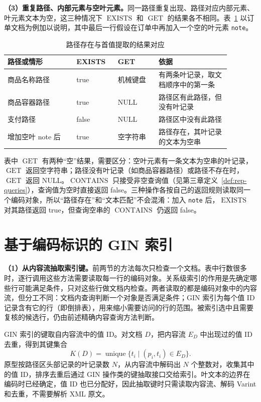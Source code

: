 \textbf{（3）重复路径、内部元素与空叶元素。}同一路径重复出现、路径对应内部元素、叶元素文本为空，这三种情况下 $\operatorname{EXISTS}$ 和 $\operatorname{GET}$ 的结果各不相同。表~\ref{tab:path-example-semantics} 以订单文档为例加以说明，其中最后一行假设在订单中再加入一个空的叶元素 \texttt{note}。
\begin{table}[htbp]
\centering\small
\caption{路径存在与首值提取的结果对应}
\label{tab:path-example-semantics}
\begin{tabular}{p{0.27\linewidth}p{0.16\linewidth}p{0.16\linewidth}p{0.29\linewidth}}
\toprule
路径或情形 & EXISTS & GET & 依据 \\
\midrule
商品名称路径 & true & 机械键盘 & 有两条叶记录，取文档顺序中的第一条 \\
商品容器路径 & true & NULL & 路径区有此路径，但没有叶记录 \\
支付路径 & false & NULL & 路径区中没有此路径 \\
增加空叶 note 后 & true & 空字符串 & 路径存在，其叶记录的文本为空串 \\
\bottomrule
\end{tabular}
\end{table}
表中 $\operatorname{GET}$ 有两种“空”结果，需要区分：空叶元素有一条文本为空串的叶记录，$\operatorname{GET}$ 返回空字符串；路径没有叶记录（如商品容器路径）或路径不存在时，$\operatorname{GET}$ 返回 NULL。$\operatorname{CONTAINS}$ 只接受非空查询值（见第三章定义~\ref{def:rep-queries}），查询值为空时直接返回 false。三种操作各按自己的返回规则读取同一个编码对象，所以“路径存在”和“文本匹配”不会混淆：加入 \texttt{note} 后，$\operatorname{EXISTS}$ 对其路径返回 true，但查询空串的 $\operatorname{CONTAINS}$ 仍返回 false。

\section{基于编码标识的 GIN 索引}
\textbf{（1）从内容流抽取索引键。}前两节的方法每次只检查一个文档。表中行数很多时，逐行调用这些方法需要读取每一行的编码对象。关系级索引的作用是先确定哪些行可能满足条件，只对这些行做文档内检查。两者读取的都是编码对象中的内容流，但分工不同：文档内查询判断一个对象是否满足条件；GIN 索引为每个值 ID 记录含有它的行（即倒排表），用来缩小需要访问的行的范围。被索引选中且需要复核的候选行，仍由前述精确内容查询方法判断。

GIN 索引的键取自内容流中的值 ID。对文档 $D$，把内容流 $E_D$ 中出现过的值 ID 去重，得到其键集合
\[
K(D)=\operatorname{unique}\{t_i\mid(p_i,t_i)\in E_D\}.
\]
原型按路径区头部记录的叶记录数 $N$，从内容流中解码出 $N$ 个整数对，收集其中的值 ID，排序去重后通过 GIN 操作类的键抽取接口交给索引\cite{pg16gin}。叶文本的边界在编码时已经确定，值 ID 也已分配好，因此抽取键时只需读取内容流、解码 Varint 和去重，不需要解析 XML 原文。

